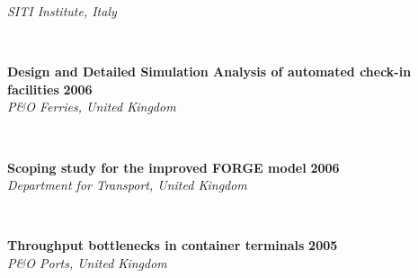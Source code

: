 \documentclass[margin]{res}
\newcommand\tab[1][1cm]{\hspace*{#1}}
\begin{document}
\begin{resume}
\begin{minipage}{\textwidth}
	\tab[0.2in] 
	\textit{SITI Institute, Italy}
	\end{minipage}\\
	\vspace{0.03in}
	\begin{minipage}{\textwidth}
	{\bf Design and Detailed Simulation Analysis of automated check-in facilities} \hfill {\bf 2006} \\
	\tab[0.2in] 
	\textit{P\&O Ferries, United Kingdom}
	\end{minipage}\\
	\vspace{0.03in}
	\begin{minipage}{\textwidth}
	{\bf Scoping study for the improved FORGE model} \hfill {\bf 2006} \\
	\tab[0.2in] 
	\textit{Department for Transport, United Kingdom}
	\end{minipage}\\
	\vspace{0.03in}
	\begin{minipage}{\textwidth}
	{\bf Throughput bottlenecks in container terminals} \hfill {\bf 2005} \\
	\tab[0.2in] 
	\textit{P\&O Ports, United Kingdom}
	\end{minipage}\\




\end{resume}
\end{document}
